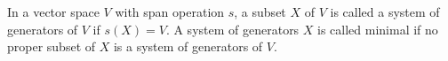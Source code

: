 In a vector space $V$ with span operation $s$, a subset $X$ of $V$ is called a system of generators of $V$ if $s(X) = V$. A system of generators $X$ is called minimal if no proper subset of $X$ is a system of generators of $V$.
